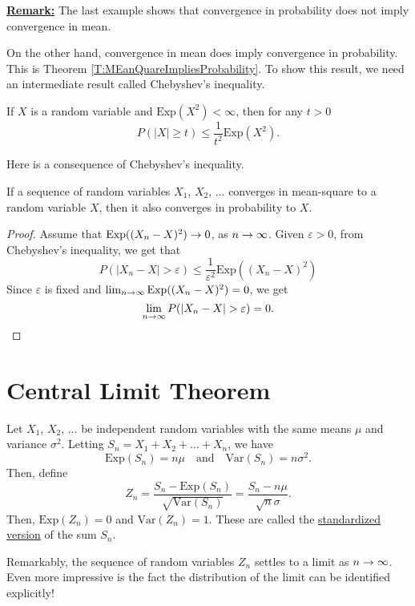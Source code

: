 \underline{\textbf{Remark:}} The last example shows that convergence in probability does not imply convergence in mean. 

On the other hand, convergence in mean does imply convergence in probability. This is Theorem \ref{T:MEanQuareImpliesProbability}. To show this result, we need an intermediate result called Chebyshev's inequality.

\begin{theorem}
If $X$ is a random variable and $\mathrm{Exp} (X^2) < \infty$, then for any $t > 0$
    \[
        P (|X| \geq t ) \leq \frac{1}{t^2} \mathrm{Exp} (X^2 ).
    \]
\end{theorem}

Here is a consequence of Chebyshev's inequality.

\begin{theorem}\label{T:MEanQuareImpliesProbability}
If a sequence of random variables $X_1$, $X_2$, $\ldots$ converges in mean-square to a random variable $X$, then it also converges in probability to $X$.
\end{theorem}
\begin{proof}
Assume that $\mathrm{Exp} ( (X_n - X)^2 ) \rightarrow 0$, as $n \rightarrow \infty$. Given $\varepsilon > 0$, from Chebyshev's inequality, we get that
    \[
        P (|X_n - X| > \varepsilon ) \leq \frac{1}{\varepsilon^2} \mathrm{Exp} ( (X_n - X)^2 ) 
    \]
Since $\varepsilon$ is fixed and $\lim_{n \rightarrow \infty} \mathrm{Exp} ( (X_n - X)^2 ) = 0$, we get
    \[
        \lim_{n \rightarrow \infty} P (|X_n - X | > \varepsilon ) = 0 . \qedhere
    \]
\end{proof}


\section{Central Limit Theorem}

Let $X_1$, $X_2$, $\ldots$ be independent random variables with the same means $\mu$ and variance $\sigma^2$. Letting $S_n = X_1 + X_2 + \ldots + X_n$, we have
    \[
        \mathrm{Exp} (S_n) = n \mu \quad \text{and} \quad \mathrm{Var} (S_n) = n \sigma^2 .
    \]
Then, define
    \[
        Z_n = \frac{S_n - \mathrm{Exp} (S_n)}{\sqrt{\mathrm{Var} (S_n)}} = \frac{S_n - n \mu}{\sqrt{n} \sigma} .
    \]
Then, $\mathrm{Exp} (Z_n) = 0$ and $\mathrm{Var} (Z_n) = 1$. These are called the \underline{standardized version} of the sum $S_n$. 

Remarkably, the sequence of random variables $Z_n$ settles to a limit as $n \rightarrow \infty$. Even more impressive is the fact the distribution of the limit can be identified explicitly!

